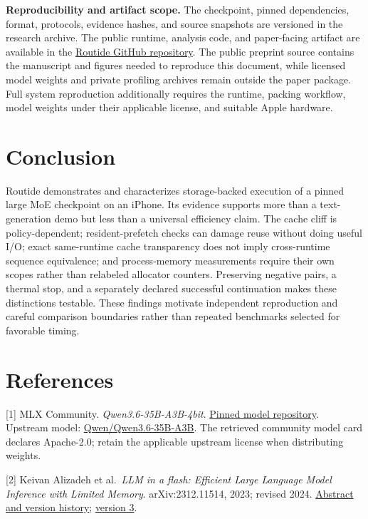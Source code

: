 \documentclass[11pt]{article}
\begin{document}
\textbf{Reproducibility and artifact scope.} The checkpoint, pinned
dependencies, format, protocols, evidence hashes, and source snapshots are
versioned in the research archive. The public runtime, analysis code, and
paper-facing artifact are available in the
\href{https://github.com/MusaShams/Routide}{Routide GitHub repository}. The
public preprint source contains the manuscript and figures needed to reproduce
this document, while licensed model weights and private profiling archives
remain outside the paper package. Full system reproduction additionally
requires the runtime, packing workflow, model weights under their applicable
license, and suitable Apple hardware.

\hypertarget{conclusion}{%
\section{Conclusion}\label{conclusion}}

Routide demonstrates and characterizes storage-backed execution of a
pinned large MoE checkpoint on an iPhone. Its evidence supports more
than a text-generation demo but less than a universal efficiency claim.
The cache cliff is policy-dependent; resident-prefetch checks can damage
reuse without doing useful I/O; exact same-runtime cache transparency
does not imply cross-runtime sequence equivalence; and process-memory
measurements require their own scopes rather than relabeled allocator
counters. Preserving negative pairs, a thermal stop, and a separately
declared successful continuation makes these distinctions testable.
These findings motivate independent reproduction and careful comparison
boundaries rather than repeated benchmarks selected for favorable timing.

\hypertarget{references}{%
\section*{References}}

{[}1{]} MLX Community. \emph{Qwen3.6-35B-A3B-4bit}.
\href{https://huggingface.co/mlx-community/Qwen3.6-35B-A3B-4bit/tree/38740b847e4cb78f352aba30aa41c76e08e6eb46}{Pinned model repository}.
Upstream model: \href{https://huggingface.co/Qwen/Qwen3.6-35B-A3B}{Qwen/Qwen3.6-35B-A3B}.
The retrieved community model card declares Apache-2.0; retain the applicable
upstream license when distributing weights.

{[}2{]} Keivan Alizadeh et al.~\emph{LLM in a flash: Efficient Large Language Model
Inference with Limited Memory}. arXiv:2312.11514, 2023; revised 2024.
\href{https://arxiv.org/abs/2312.11514}{Abstract and version history};
\href{https://arxiv.org/html/2312.11514v3}{version 3}.
\end{document}
